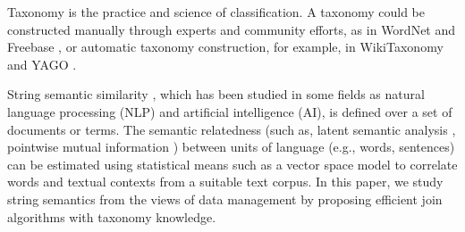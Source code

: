  
 
 Taxonomy is the practice and science of classification.  A taxonomy could be constructed manually through experts and community efforts, as in WordNet \cite{books/fellbaum1998wordnet} and Freebase \cite{conf/aaai/BollackerCT07}, or automatic taxonomy construction, for example, in WikiTaxonomy \cite{conf/ecai/PonzettoS08} and YAGO \cite{conf/cidr/MahdisoltaniBS15}.

\smallskip


String semantic similarity \cite{conf/cikm/SayedHZ07,conf/cl/WuP94,journals/jair/Resnik99}, which has been studied in some fields as natural language processing (NLP) and artificial intelligence (AI), is defined over a set of documents or terms. The semantic relatedness (such as, latent semantic analysis \cite{conf/cscl/LandauerD02},  pointwise mutual information \cite{conf/pkdd/Schneider05} )  between units of language (e.g., words, sentences) can be estimated using statistical means such as a vector space model to correlate words and textual contexts from a suitable text corpus. In this paper, we study string semantics from the views of data management by proposing efficient join algorithms with taxonomy knowledge.

